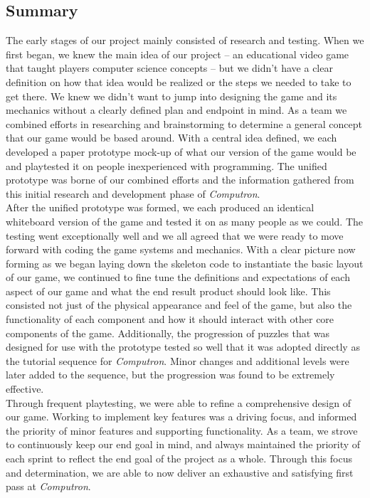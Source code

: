 \subsection{Summary}
The early stages of our project mainly consisted of research and testing. When we first began, we knew the main idea of our project -- an educational video game that taught players computer science concepts -- but we didn't have a clear definition on how that idea would be realized or the steps we needed to take to get there. We knew we didn't want to jump into designing the game and its mechanics without a clearly defined plan and endpoint in mind. As a team we combined efforts in researching and brainstorming to determine a general concept that our game would be based around. With a central idea defined, we each developed a paper prototype mock-up of what our version of the game would be and playtested it on people inexperienced with programming. The unified prototype was borne of our combined efforts and the information gathered from this initial research and development phase of \textit{Computron}.\\

After the unified prototype was formed, we each produced an identical whiteboard version of the game and tested it on as many people as we could. The testing went exceptionally well and we all agreed that we were ready to move forward with coding the game systems and mechanics. With a clear picture now forming as we began laying down the skeleton code to instantiate the basic layout of our game, we continued to fine tune the definitions and expectations of each aspect of our game and what the end result product should look like. This consisted not just of the physical appearance and feel of the game, but also the functionality of each component and how it should interact with other core components of the game. Additionally, the progression of puzzles that was designed for use with the prototype tested so well that it was adopted directly as the tutorial sequence for \textit{Computron}. Minor changes and additional levels were later added to the sequence, but the progression was found to be extremely effective.\\

Through frequent playtesting, we were able to refine a comprehensive design of our game. Working to implement key features was a driving focus, and informed the priority of minor features and supporting functionality. As a team, we strove to continuously keep our end goal in mind, and always maintained the priority of each sprint to reflect the end goal of the project as a whole. Through this focus and determination, we are able to now deliver an exhaustive and satisfying first pass at \textit{Computron}.\\

